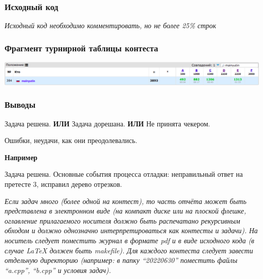 \subsubsection*{Исходный код}
\textit{Исходный код необходимо комментировать, но не более 25\% строк}


\subsubsection*{Фрагмент турнирной таблицы контеста}
\begin{center}
\includegraphics[width=\textwidth]{standings/sample-cf.png}\newline\noindent
\end{center}

\subsubsection*{Выводы}
Задача решена. \textbf{ИЛИ} Задача дорешана. \textbf{ИЛИ} Не принята чекером.

Ошибки, неудачи, как они преодолевались.

{\bfseries \large Например}

Задача решена. Основные события процесса отладки: неправильный ответ на претесте 3, исправил дерево отрезков.

\vspace{16pt}
\textit{Если задач много (более одной на контест), то часть отчёта может быть представлена в электронном виде (на компакт диске или на плоской флешке, оглавление прилагаемого носителя должно быть распечатано рекурсивным обходом и должно однозначно интерпретироваться как контесты и задачи). На носитель следует поместить журнал в формате pdf и в виде исходного кода (в случае LaTeX должен быть makefile). Для каждого контеста следует завести отдельную директорию (например: в папку \enquote{20220630} поместить файлы \enquote{a.cpp}, \enquote{b.cpp} и условия задач).}

\pagebreak
